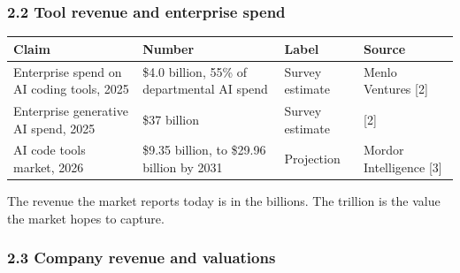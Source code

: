\documentclass[
  10pt,
]{article}
\newcounter{none} %
\begin{document}
\subsubsection{2.2 Tool revenue and enterprise
spend}\label{tool-revenue-and-enterprise-spend}

{\def\LTcaptype{none} %
\begin{longtable}[]{@{}
  >{\raggedright\arraybackslash}p{}
  >{\raggedright\arraybackslash}p{}
  >{\raggedright\arraybackslash}p{}
  >{\raggedright\arraybackslash}p{}@{}}
\toprule\noalign{}
\begin{minipage}[b]{\linewidth}\raggedright
Claim
\end{minipage} & \begin{minipage}[b]{\linewidth}\raggedright
Number
\end{minipage} & \begin{minipage}[b]{\linewidth}\raggedright
Label
\end{minipage} & \begin{minipage}[b]{\linewidth}\raggedright
Source
\end{minipage} \\
\midrule\noalign{}
\endhead
\bottomrule\noalign{}
\endlastfoot
Enterprise spend on AI coding tools, 2025 & \$4.0 billion, 55\% of
departmental AI spend & Survey estimate & Menlo Ventures {[}2{]} \\
Enterprise generative AI spend, 2025 & \$37 billion & Survey estimate &
{[}2{]} \\
AI code tools market, 2026 & \$9.35 billion, to \$29.96 billion by 2031
& Projection & Mordor Intelligence {[}3{]} \\
\end{longtable}
}

The revenue the market reports today is in the billions. The trillion is
the value the market hopes to capture.

\subsubsection{2.3 Company revenue and
valuations}\label{company-revenue-and-valuations}
\end{document}
